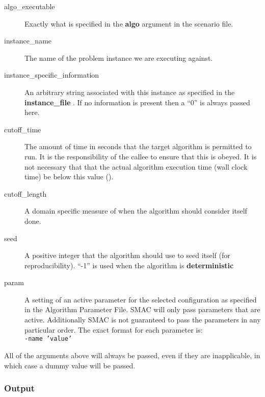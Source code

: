 \documentclass[manual.tex]{subfiles}
\begin{document}
\begin{description}
\item [{algo\_executable}] Exactly what is specified in the \textbf{algo} argument in the scenario file.
 
\item [{instance\_name}] The name of the problem instance we are executing
against.

\item [{instance\_specific\_information}] An arbitrary string associated
with this instance as specified in the \textbf{instance\_file }. If
no information is present then a ``0'' is always passed here. 

\item [{cutoff\_time}] The amount of time in seconds that the target algorithm
is permitted to run. It is the responsibility of the callee
to ensure that this is obeyed. It is not necessary that that the actual
algorithm execution time (wall clock time) be below this value ().

\item [{cutoff\_length}] A domain specific measure of when the algorithm should consider itself done.

\item [{seed}] A positive integer that the algorithm should use to seed
itself (for reproducibility). ``-1'' is used when the algorithm is \textbf{deterministic}

\item [{param}] A setting of an active parameter for the selected configuration
as specified in the Algorithm Parameter File. SMAC will only pass
parameters that are active. Additionally SMAC is not guaranteed
to pass the parameters in any particular order. The exact format for
each parameter is:\\
\texttt{-name~'value'}

\end{description}

All of the arguments above will always be passed, even if they are inapplicable, in which case a dummy value will be passed.

\subsubsection{Output}\label{sec:wrapper_output}
\end{document}
